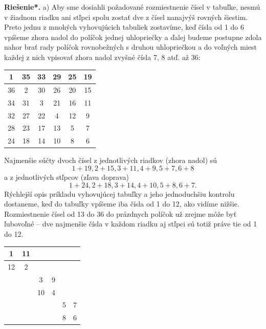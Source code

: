\documentclass[11pt,a4paper,oneside,final]{book}
\newcommand{\rieh}{\textbf{Riešenie*.} }
\begin{document}
\rieh  a) Aby sme dosiahli požadované rozmiestnenie čísel v tabuľke, nesmú v žiadnom riadku ani stľpci spolu zostať dve z čísel nanajvýš rovných šiestim. Preto jednu z mnohých vyhovujúcich tabuliek zostavíme, keď čísla od 1 do 6 vpíšeme zhora nadol do políčok jednej uhlopriečky a ďalej budeme postupne zdola nahor brať rady políčok rovnobežných s druhou uhlopriečkou a do voľných miest každej z nich vpisovať zhora
nadol zvyšné čísla 7, 8 atď. až 36:
\begin{center}
\begin{tabular}{|c|c|c|c|c|c|}
\hline
1 & 35 & 33 & 29 & 25 & 19 \\
\hline
36 & 2 & 30 & 26 & 20 & 15 \\
\hline
34 & 31 & 3 & 21 & 16 &11 \\
\hline
32 & 27 & 22 & 4 & 12 & 9 \\
\hline
28 & 23 & 17 & 13 & 5 & 7 \\
\hline
24 & 18 & 14 & 10 & 8 & 6\\
\hline
\end{tabular}
\end{center}
Najmenšie súčty dvoch čísel z jednotlivých riadkov (zhora nadol) sú
$$1 + 19, 2 + 15, 3 + 11, 4 + 9, 5 + 7, 6 + 8$$
a z jednotlivých stľpcov (zľava doprava)
$$1 + 24, 2 + 18, 3 + 14, 4 + 10, 5 + 8, 6 + 7.$$
Rýchlejší opis príkladu vyhovujúcej tabuľky a jeho jednoduchšiu kontrolu dostaneme, keď do tabuľky vpíšeme iba čísla od 1 do 12, ako vidíme nižšie. Rozmiestnenie čísel od 13 do 36 do prázdnych políčok už zrejme môže byť ľubovoľné -- dve najmenšie čísla v každom riadku aj stľpci sú totiž práve tie od 1 do 12.
\begin{center}
\begin{tabular}{|c|c|c|c|c|c|}
\hline
1 & 11 & & & & \\
\hline
12 & 2 & & & & \\
\hline
 & & 3 & 9 & & \\
\hline
 & & 10 & 4 & & \\
\hline
 & & & & 5 & 7\\
\hline
 & & & & 8 & 6 \\
\hline
\end{tabular}
\end{center}
\end{document}
